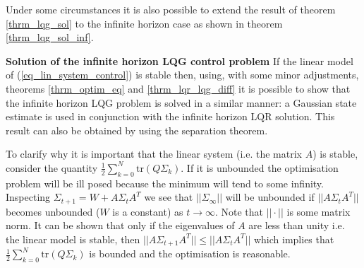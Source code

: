 Under some circumstances it is also possible to extend the result of theorem \ref{thrm_lqg_sol} to the infinite horizon case as shown in theorem \ref{thrm_lqg_sol_inf}.
\begin{thrm}
\textbf{Solution of the infinite horizon LQG control problem} If the linear model of (\ref{eq_lin_system_control}) is stable then, using, with some minor adjustments, theorems \ref{thrm_optim_eq} and \ref{thrm_lqr_lqg_diff} it is possible to show that the infinite horizon LQG problem is solved in a similar manner: a Gaussian state estimate is used in conjunction with the infinite horizon LQR solution. This result can also be obtained by using the separation theorem. \label{thrm_lqg_sol_inf}
\end{thrm}
To clarify why it is important that the linear system (i.e. the matrix $A$) is stable, consider the quantity $\frac{1}{2}\sum_{k=0}^N \text{tr}(Q\Sigma_k)$. If it is unbounded the optimisation problem will be ill posed because the minimum will tend to some infinity. Inspecting $\Sigma_{t+1} = W+A\Sigma_t A^T$ we see that $||\Sigma_{\infty}||$ will be unbounded if $||A\Sigma_t A^T||$ becomes unbounded ($W$ is a constant) as $t \rightarrow \infty$. Note that $||\cdot||$ is some matrix norm. It can be shown that only if the eigenvalues of $A$ are less than unity i.e. the linear model is stable, then $||A\Sigma_{t+1}A^T|| \leq ||A\Sigma_{t}A^T||$ which implies that $\frac{1}{2}\sum_{k=0}^N \text{tr}(Q\Sigma_k)$ is bounded and the optimisation is reasonable.

